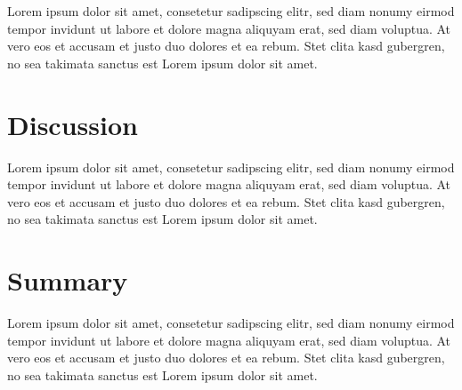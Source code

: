 \documentclass[10pt,conference,compsocconf]{IEEEtran}
\begin{document}


Lorem ipsum dolor sit amet, consetetur sadipscing elitr, sed diam nonumy eirmod
tempor invidunt ut labore et dolore magna aliquyam erat, sed diam voluptua. At
vero eos et accusam et justo duo dolores et ea rebum. Stet clita kasd gubergren,
no sea takimata sanctus est Lorem ipsum dolor sit amet.


\section{Discussion}
\label{sec:discussion}

Lorem ipsum dolor sit amet, consetetur sadipscing elitr, sed diam nonumy eirmod
tempor invidunt ut labore et dolore magna aliquyam erat, sed diam voluptua. At
vero eos et accusam et justo duo dolores et ea rebum. Stet clita kasd gubergren,
no sea takimata sanctus est Lorem ipsum dolor sit amet.


\section{Summary}
\label{sec:summary}

Lorem ipsum dolor sit amet, consetetur sadipscing elitr, sed diam nonumy eirmod
tempor invidunt ut labore et dolore magna aliquyam erat, sed diam voluptua. At
vero eos et accusam et justo duo dolores et ea rebum. Stet clita kasd gubergren,
no sea takimata sanctus est Lorem ipsum dolor sit amet.

\printbibliography%
\end{document}
